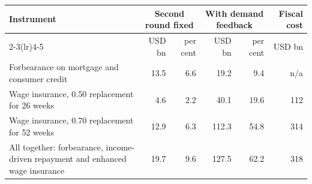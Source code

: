 \setlength{\tabcolsep}{4pt}
\begin{tabular}{p{4.0cm}rrrrr}
\toprule
Instrument & \multicolumn{2}{c}{Second round fixed} & \multicolumn{2}{c}{With demand feedback} & Fiscal cost \\
\cmidrule(lr){2-3}\cmidrule(lr){4-5}
 & USD bn & per cent & USD bn & per cent & USD bn \\
\midrule
Forbearance on mortgage and consumer credit & 13.5 & 6.6 & 19.2 & 9.4 & n/a \\
Wage insurance, 0.50 replacement for 26 weeks & 4.6 & 2.2 & 40.1 & 19.6 & 112 \\
Wage insurance, 0.70 replacement for 52 weeks & 12.9 & 6.3 & 112.3 & 54.8 & 314 \\
All together: forbearance, income-driven repayment and enhanced wage insurance & 19.7 & 9.6 & 127.5 & 62.2 & 318 \\
\bottomrule
\end{tabular}
